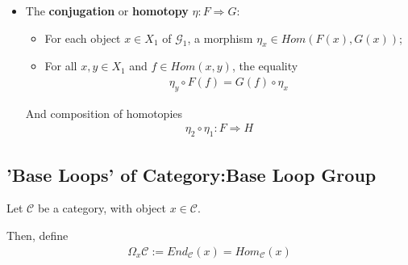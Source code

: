 \documentclass[Total.tex]{subfiles}
\begin{document}
\begin{Def}
\begin{itemize}
					with:
					\begin{itemize}
						\item A function $F_0:X_1\rightarrow X_2$;
						\item For $x,y\in X_1$, then 
						\begin{gather*}
							F_{x,y}:Hom(x,y)\rightarrow Hom(F_0(X),F_0(y))
						\end{gather*}
					\end{itemize}
					
					such that
					\begin{itemize}
						\item (Composition)
						\item (Identities)
					\end{itemize}
					
					\item The \textbf{conjugation} or \textbf{homotopy} $\eta:F\Rightarrow G$:
					\begin{itemize}
						\item For each object $x\in X_1$ of $\mathcal{G}_1$, a morphism $\eta_x\in Hom(F(x),G(x))$;
						\item For all $x,y\in X_1$ and $f\in Hom(x,y)$, the equality
						\begin{gather*}
							\eta_y\circ F(f)=G(f)\circ \eta_x
						\end{gather*}
						\begin{center}
						\end{center}
						
					\end{itemize}
					
					
					And composition of homotopies
					\begin{gather*}
						\eta_2\circ \eta_1:F\Rightarrow H
					\end{gather*}
				\end{itemize}
			\end{Def}
			\subsection{'Base Loops' of Category:Base Loop Group}
				\begin{Def}
					Let $\mathcal{C}$ be a category, with object $x\in \mathcal{C}$.
					
					Then, define
					\begin{gather*}
						\Omega_x \mathcal{C}:=End_\mathcal{C}(x)=Hom_\mathcal{C}(x)
					\end{gather*}
				\end{Def}
\end{document}
